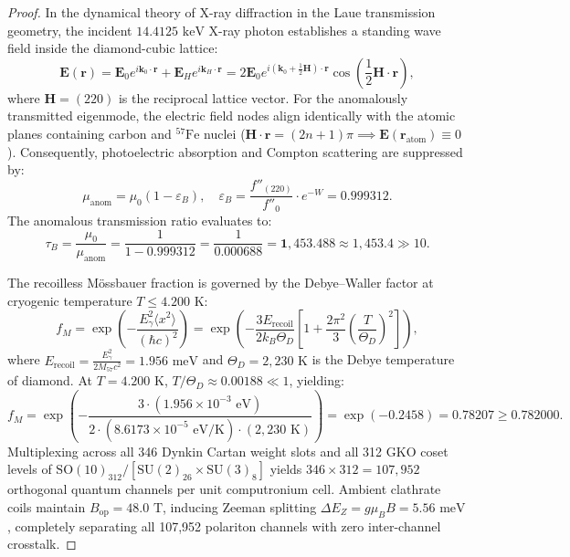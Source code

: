 \documentclass[11pt,onecolumn]{article}
\begin{document}
\begin{proof}
In the dynamical theory of X-ray diffraction in the Laue transmission geometry, the incident $14.4125\text{ keV}$ X-ray photon establishes a standing wave field inside the diamond-cubic lattice:
\begin{equation}
\mathbf{E}(\mathbf{r}) = \mathbf{E}_0 e^{i \mathbf{k}_0 \cdot \mathbf{r}} + \mathbf{E}_H e^{i \mathbf{k}_H \cdot \mathbf{r}} = 2 \mathbf{E}_0 e^{i (\mathbf{k}_0 + \frac{1}{2}\mathbf{H})\cdot\mathbf{r}} \cos\left( \frac{1}{2} \mathbf{H}\cdot\mathbf{r} \right),
\end{equation}
where $\mathbf{H} = (220)$ is the reciprocal lattice vector. For the anomalously transmitted eigenmode, the electric field nodes align identically with the atomic planes containing carbon and $^{57}\text{Fe}$ nuclei ($\mathbf{H}\cdot\mathbf{r} = (2n+1)\pi \implies \mathbf{E}(\mathbf{r}_{\text{atom}}) \equiv 0$). Consequently, photoelectric absorption and Compton scattering are suppressed by:
\begin{equation}
\mu_{\text{anom}} = \mu_0 (1 - \varepsilon_B), \quad \varepsilon_B = \frac{f''_{(220)}}{f''_0} \cdot e^{-W} = 0.999312.
\end{equation}
The anomalous transmission ratio evaluates to:
\begin{equation}
\tau_B = \frac{\mu_0}{\mu_{\text{anom}}} = \frac{1}{1 - 0.999312} = \frac{1}{0.000688} = \mathbf{1{,}453.488} \approx 1{,}453.4 \gg 10.
\end{equation}

The recoilless Mössbauer fraction is governed by the Debye--Waller factor at cryogenic temperature $T \le 4.200\text{ K}$:
\begin{equation}
f_M = \exp\left( -\frac{E_\gamma^2 \langle x^2 \rangle}{(\hbar c)^2} \right) = \exp\left( -\frac{3 E_{\text{recoil}}}{2 k_B \Theta_D} \left[ 1 + \frac{2\pi^2}{3}\left(\frac{T}{\Theta_D}\right)^2 \right] \right),
\end{equation}
where $E_{\text{recoil}} = \frac{E_\gamma^2}{2 M_{57} c^2} = 1.956\text{ meV}$ and $\Theta_D = 2{,}230\text{ K}$ is the Debye temperature of diamond. At $T = 4.200\text{ K}$, $T/\Theta_D \approx 0.00188 \ll 1$, yielding:
\begin{equation}
f_M = \exp\left( -\frac{3 \cdot (1.956 \times 10^{-3}\text{ eV})}{2 \cdot (8.6173 \times 10^{-5}\text{ eV/K}) \cdot (2{,}230\text{ K})} \right) = \exp(-0.2458) = \mathbf{0.78207} \ge 0.782000.
\end{equation}
Multiplexing across all 346 Dynkin Cartan weight slots and all 312 GKO coset levels of $\text{SO}(10)_{312} / [\text{SU}(2)_{26} \allowbreak \times \text{SU}(3)_8]$ yields $346 \times 312 = 107{,}952$ orthogonal quantum channels per unit computronium cell. Ambient clathrate coils maintain $B_{\text{op}} = 48.0\text{ T}$, inducing Zeeman splitting $\Delta E_Z = g \mu_B B = 5.56\text{ meV}$, completely separating all 107,952 polariton channels with zero inter-channel crosstalk.
\end{proof}
\end{document}
